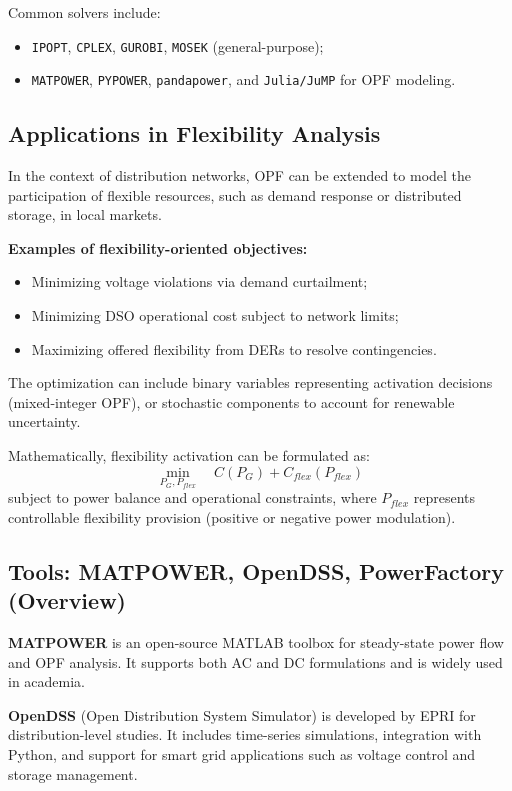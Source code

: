 \documentclass[11pt]{article}
\begin{document}
	Common solvers include:
	\begin{itemize}
		\item \texttt{IPOPT}, \texttt{CPLEX}, \texttt{GUROBI}, \texttt{MOSEK} (general-purpose);
		\item \texttt{MATPOWER}, \texttt{PYPOWER}, \texttt{pandapower}, and \texttt{Julia/JuMP} for OPF modeling.
	\end{itemize}
	
	\subsection{Applications in Flexibility Analysis}
	
	In the context of distribution networks, OPF can be extended to model the participation of flexible resources, such as demand response or distributed storage, in local markets.
	
	\textbf{Examples of flexibility-oriented objectives:}
	\begin{itemize}
		\item Minimizing voltage violations via demand curtailment;
		\item Minimizing DSO operational cost subject to network limits;
		\item Maximizing offered flexibility from DERs to resolve contingencies.
	\end{itemize}
	
	The optimization can include binary variables representing activation decisions (mixed-integer OPF), or stochastic components to account for renewable uncertainty.
	
	Mathematically, flexibility activation can be formulated as:
	\[
	\min_{P_{G}, P_{flex}} \quad C(P_{G}) + C_{flex}(P_{flex})
	\]
	subject to power balance and operational constraints, where $P_{flex}$ represents controllable flexibility provision (positive or negative power modulation).
	
	\subsection{Tools: MATPOWER, OpenDSS, PowerFactory (Overview)}
	
	\textbf{MATPOWER} \cite{zimmerman2011matpower} is an open-source MATLAB toolbox for steady-state power flow and OPF analysis.  
	It supports both AC and DC formulations and is widely used in academia.
	
	\textbf{OpenDSS} (Open Distribution System Simulator) is developed by EPRI for distribution-level studies.  
	It includes time-series simulations, integration with Python, and support for smart grid applications such as voltage control and storage management.
	
\end{document}
